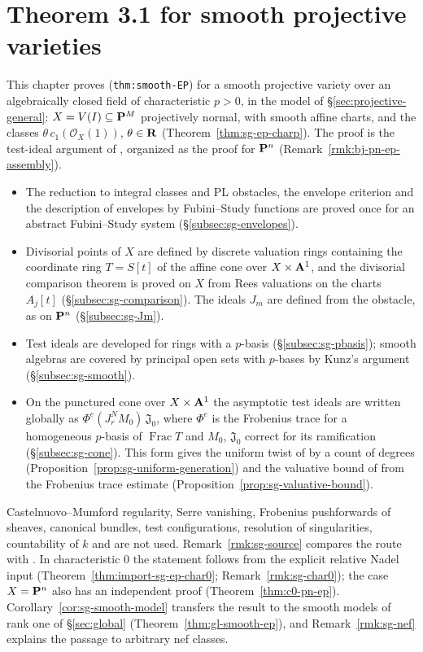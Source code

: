 \section{Theorem 3.1 for smooth projective varieties}\label{sec:smooth-general}

This chapter proves \cite[Theorem~3.1]{FHX} (\texttt{thm:smooth-EP}) for a smooth projective variety over an
algebraically closed field of characteristic $p>0$, in the model of \S\ref{sec:projective-general}: $X=V(I)\subseteq\mathbf{P}^M$
projectively normal, with smooth affine charts, and the classes $\theta\,c_1(\mathcal O_X(1))$, $\theta\in\mathbf{R}$
(Theorem~\ref{thm:sg-ep-charp}). The proof is the test-ideal argument of \cite[\S3]{FHX}, organized as the proof for
$\mathbf{P}^n$ (Remark~\ref{rmk:bj-pn-ep-assembly}).
\begin{itemize}
\item The reduction to integral classes and PL obstacles, the envelope criterion and the description of envelopes by
Fubini--Study functions are proved once for an abstract Fubini--Study system (\S\ref{subsec:sg-envelopes}).
\item Divisorial points of $X$ are defined by discrete valuation rings containing the coordinate ring
$T=S[t]$ of the affine cone over $X\times\mathbf{A}^1$, and the divisorial comparison theorem \cite[Theorem~4.22]{BJ22} is
proved on $X$ from Rees valuations on the charts $A_j[t]$ (\S\ref{subsec:sg-comparison}). The ideals $J_m$ are
defined from the obstacle, as on $\mathbf{P}^n$ (\S\ref{subsec:sg-Jm}).
\item Test ideals are developed for rings with a $p$-basis (\S\ref{subsec:sg-pbasis}); smooth algebras are covered by
principal open sets with $p$-bases by Kunz's argument (\S\ref{subsec:sg-smooth}).
\item On the punctured cone over $X\times\mathbf{A}^1$ the asymptotic test ideals are written globally as
$\Phi^e(J_r^NM_0)\,\mathfrak J_0$, where $\Phi^e$ is the Frobenius trace for a homogeneous $p$-basis of $\operatorname{Frac}T$
and $M_0$, $\mathfrak J_0$ correct for its ramification (\S\ref{subsec:sg-cone}). This form gives the uniform twist of
\cite[Lemma~3.2]{FHX} by a count of degrees (Proposition~\ref{prop:sg-uniform-generation}) and the valuative bound of
\cite[Lemma~3.3]{FHX} from the Frobenius trace estimate (Proposition~\ref{prop:sg-valuative-bound}).
\end{itemize}
Castelnuovo--Mumford regularity, Serre vanishing, Frobenius pushforwards of sheaves, canonical bundles, test
configurations, resolution of singularities, countability of $k$ and \cite[Theorem~6.21]{BJ22} are not used.
Remark~\ref{rmk:sg-source} compares the route with \cite[\S3]{FHX}. In characteristic $0$ the statement follows from the explicit relative Nadel
input (Theorem~\ref{thm:import-sg-ep-char0}; Remark~\ref{rmk:sg-char0}); the case $X=\mathbf{P}^n$
also has an independent proof
(Theorem~\ref{thm:c0-pn-ep}). Corollary~\ref{cor:sg-smooth-model} transfers the result to the smooth models of rank one of
\S\ref{sec:global} (Theorem~\ref{thm:gl-smooth-ep}), and Remark~\ref{rmk:sg-nef} explains the passage to arbitrary nef classes.

